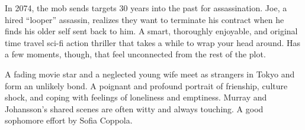 \iffalse
\movie{Lives of Others, The}{2006}{137m}{\four} \dir{Florian Henckel von Donnersmarck}
\fi

   In 2074, the mob sends targets 30 years into the past for assassination. Joe, a hired ``looper'' assassin, realizes they want to terminate his contract when he finds his older self sent back to him. A smart, thoroughly enjoyable, and original time travel sci-fi action thriller that takes a while to wrap your head around. Has a few moments, though, that feel unconnected from the rest of the plot. \author{DW} 

\iffalse
\movie{Lord of the Rings: The Fellowship of the Ring, The}{2001}{178m}{\threehalf} \dir{Peter Jackson} \author{AW} \mpaa{PG-13}

\movie{Lord of the Rings: The Two Towers, The}{2002}{179m}{\three} \dir{Peter Jackson} \author{AW} \mpaa{PG-13}

\movie{Lord of the Rings: The Return of the King, The}{2003}{200m}{\threehalf} \dir{Peter Jackson} \author{AW} \mpaa{PG-13}
\fi

   A fading movie star and a neglected young wife meet as strangers in Tokyo and form an unlikely bond. A poignant and profound portrait of frienship, culture shock, and coping with feelings of loneliness and emptiness. Murray and Johansson's shared scenes are often witty and always touching. A good sophomore effort by Sofia Coppola. \author{DW} 
